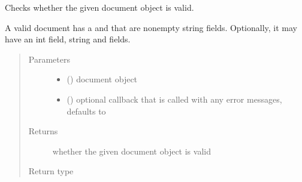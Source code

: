 \documentclass[letterpaper,10pt,english]{sphinxmanual}
\begin{document}
\begin{fulllineitems}
\label{\detokenize{autoapi/pine/client/models/index:pine.client.models.is_valid_eve_document}}
Checks whether the given document object is valid.

A valid document has a  and  that are non\sphinxhyphen{}empty string fields.
Optionally, it may have an int  field, string  and  fields.
\begin{quote}\begin{description}
\item[{Parameters}] \leavevmode\begin{itemize}
\item {} 
 () \textendash{} document object

\item {} 
 (\sphinxstyleliteralemphasis{\sphinxupquote{, }}) \textendash{} optional callback that is called with any error messages, defaults to 

\end{itemize}

\item[{Returns}] \leavevmode
whether the given document object is valid

\item[{Return type}] \leavevmode
{}

\end{description}\end{quote}

\end{fulllineitems}
\end{document}
